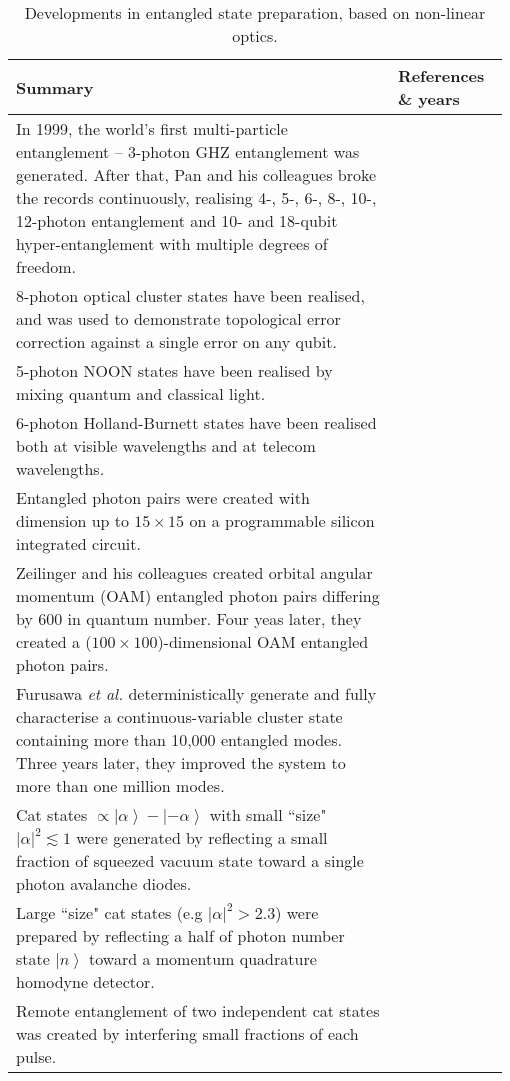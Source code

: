 \begin{table*}[!htbp]
	\begin{tabular}{|p{0.755\linewidth}|p{0.22\linewidth}|}
		\hline
		Summary & References \& years \\
		\hline \hline
        In 1999, the world's first multi-particle entanglement -- 3-photon GHZ entanglement was generated. After that, Pan and his colleagues broke the records continuously, realising 4-, 5-, 6-, 8-, 10-, 12-photon entanglement and 10- and 18-qubit hyper-entanglement with multiple degrees of freedom. & \cite{bib:bouwmeester1999observation, bib:wang201818, bib:zhong201812}  \\
		\hline
		8-photon optical cluster states have been realised, and was used to demonstrate topological error correction against a single error on any qubit. &  \cite{bib:yao2012experimental}  \\
		\hline
		5-photon NOON states have been realised by mixing quantum and classical light. & \cite{bib:afek2010high} \\
		\hline
		6-photon Holland-Burnett states have been realised both at visible wavelengths and at telecom wavelengths. & \cite{bib:xiang2012optimal,  bib:jin2016detection} \\
		\hline
		Entangled photon pairs were created with dimension up to \mbox{$15\times 15$} on a programmable silicon integrated circuit. & \cite{bib:wang2018multidimensional} \\
		\hline
		Zeilinger and his colleagues created orbital angular momentum (OAM) entangled photon pairs differing by 600 in quantum number. Four yeas later, they created a ($100\times 100$)-dimensional OAM entangled photon pairs. & \cite{bib:fickler2012quantum} \\
		\hline
		Furusawa \textit{et al.} deterministically generate and fully characterise a continuous-variable cluster state containing more than 10,000 entangled modes. Three years later, they improved the system to more than one million modes. & \cite{bib:yokoyama2013ultra, bib:yoshikawa2016invited} \\
		\hline
        Cat states $\propto \left| \alpha  \right\rangle  - \left| { - \alpha } \right\rangle $ with small ``size" ${\left| \alpha  \right|^2} \lesssim 1$ were generated by reflecting a small fraction of squeezed vacuum state toward a single photon avalanche diodes. & \cite{bib:neergaard2006generation,  bib:ourjoumtsev2006generating, bib:wakui2007photon} \\
        \hline
        Large ``size" cat states (e.g ${\left| \alpha  \right|^2} > 2.3$) were prepared by reflecting a half of photon number state $\left| n \right\rangle$ toward a momentum quadrature homodyne detector. & \cite{bib:ourjoumtsev2007generation, bib:takahashi2008generation} \\
		\hline
		Remote entanglement of two independent cat states was created by interfering small fractions of each pulse. & \cite{bib:ourjoumtsev2009preparation} \\
		\hline
	\end{tabular}
	\captionspacetab \caption{Developments in entangled state preparation, based on non-linear optics.} \label{tab:entangled_states}
\end{table*}

